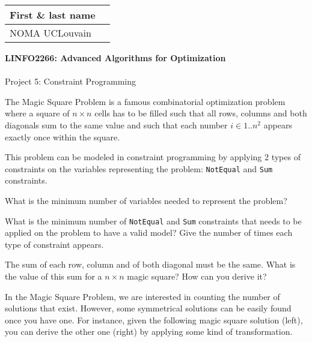 \documentclass[12pt]{report}
\newcommand{\answerbox}[2]{\hfill\break\\
	\framebox[\linewidth]{\parbox[c][#1][c]{\dimexpr\linewidth-2\fboxsep-2\fboxrule}{#2}}
}
\newcounter{row}
\newcounter{col}
\begin{document}
	\hfill
	\begingroup
	\Large
	\begin{tabular}{|l|p{6cm}|}
		\hline
		First \& last name &
		\\ \hline
		NOMA UCLouvain &
		\\ \hline
	\end{tabular}
	\endgroup
	\vspace{1.5cm}

	\noindent
	\begingroup
	\Large
	\textbf{LINFO2266: Advanced Algorithms for Optimization}\\\\
	Project 5: Constraint Programming
	\endgroup
	\vspace{0.2cm}

	\begin{Exercise}[title={Modeling the Magic Square Problem}]

		The Magic Square Problem is a famous combinatorial optimization problem where a square of $n\times n$ cells has to be filled such that all rows, columns and both diagonals sum to the same value and such that each number $i \in 1..n^2$ appears exactly once within the square.

		This problem can be modeled in constraint programming by applying 2 types of constraints on the variables representing the problem: \texttt{NotEqual} and \texttt{Sum} constraints.

		\Question What is the minimum number of variables needed to represent the problem?
		\answerbox{2cm}{
		}

		\Question What is the minimum number of \texttt{NotEqual} and \texttt{Sum} constraints that needs to be applied on the problem to have a valid model? Give the number of times each type of constraint appears.
		\answerbox{3cm}{
		}

		\Question The sum of each row, column and of both diagonal must be the same. What is the value of this sum for a $n\times n$ magic square? How can you derive it?
		\answerbox{4cm}{
		}

		In the Magic Square Problem, we are interested in counting the number of solutions that exist. However, some symmetrical solutions can be easily found once you have one. For instance, given the following magic square solution (left), you can derive the other one (right) by applying some kind of transformation.

		\begin{minipage}{0.4\linewidth}
			\centering
			\begin{tikzpicture}[scale=0.8]


\end{tikzpicture}
\end{minipage}
\end{Exercise}
\end{document}
